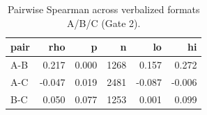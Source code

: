 \begin{table}
\caption{Pairwise Spearman across verbalized formats A/B/C (Gate 2).}
\label{tab:t5_h0_format_agreement}
\begin{tabular}{lrrrrr}
\toprule
pair & rho & p & n & lo & hi \\
\midrule
A-B & 0.217 & 0.000 & 1268 & 0.157 & 0.272 \\
A-C & -0.047 & 0.019 & 2481 & -0.087 & -0.006 \\
B-C & 0.050 & 0.077 & 1253 & 0.001 & 0.099 \\
\bottomrule
\end{tabular}
\end{table}
